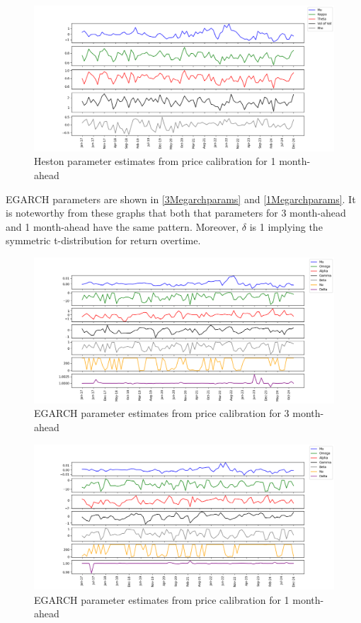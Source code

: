 \documentclass[12pt,a4paper]{article}
\newcommand\colorAutoref[1]{{\hypersetup{linkcolor=black}\autoref{#1}}}
\numberwithin{equation}{section}
\begin{document}
\begin{figure}[h!] 
\includegraphics[scale=1,width=1\linewidth,height=0.4\textheight]{heston_params_1m.png}
\caption{Heston parameter estimates from price calibration for 1 month-ahead}
\label{1Mhestonparams}
\end{figure}

EGARCH parameters are shown in \colorAutoref{3Megarchparams} and  \colorAutoref{1Megarchparams}. It is noteworthy from these graphs that both that parameters for 3 month-ahead and 1 month-ahead have the same pattern. Moreover, $\delta$ is 1 implying the symmetric t-distribution for return overtime. 

\begin{figure}[h!] 
\includegraphics[scale=1,width=1\linewidth,height=0.4\textheight]{egarch_params_3m.png}
\caption{EGARCH parameter estimates from price calibration for 3 month-ahead}
\label{3Megarchparams}
\end{figure}

\begin{figure}[h!] 
\includegraphics[scale=1,width=1\linewidth,height=0.4\textheight]{egarch_params_1m.png}
\caption{EGARCH parameter estimates from price calibration for 1 month-ahead}
\label{1Megarchparams}
\end{figure}
\end{document}
